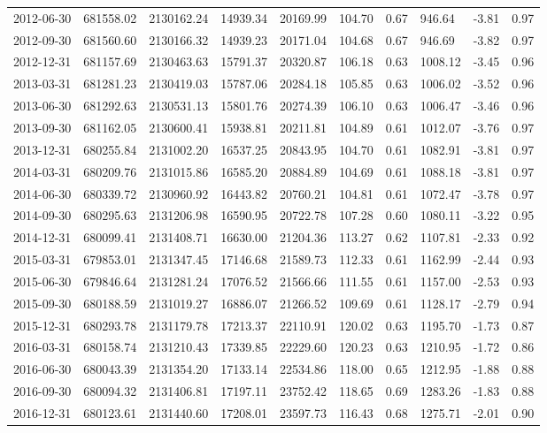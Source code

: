 \begin{landscape}
\begin{longtable}{llllllllll}
2012-06-30 & 681558.02 & 2130162.24 & 14939.34 & 20169.99 & 104.70 & 0.67 & 946.64  & -3.81  & 0.97 \\
2012-09-30 & 681560.60 & 2130166.32 & 14939.23 & 20171.04 & 104.68 & 0.67 & 946.69  & -3.82  & 0.97 \\
2012-12-31 & 681157.69 & 2130463.63 & 15791.37 & 20320.87 & 106.18 & 0.63 & 1008.12 & -3.45  & 0.96 \\
2013-03-31 & 681281.23 & 2130419.03 & 15787.06 & 20284.18 & 105.85 & 0.63 & 1006.02 & -3.52  & 0.96 \\
2013-06-30 & 681292.63 & 2130531.13 & 15801.76 & 20274.39 & 106.10 & 0.63 & 1006.47 & -3.46  & 0.96 \\
2013-09-30 & 681162.05 & 2130600.41 & 15938.81 & 20211.81 & 104.89 & 0.61 & 1012.07 & -3.76  & 0.97 \\
2013-12-31 & 680255.84 & 2131002.20 & 16537.25 & 20843.95 & 104.70 & 0.61 & 1082.91 & -3.81  & 0.97 \\
2014-03-31 & 680209.76 & 2131015.86 & 16585.20 & 20884.89 & 104.69 & 0.61 & 1088.18 & -3.81  & 0.97 \\
2014-06-30 & 680339.72 & 2130960.92 & 16443.82 & 20760.21 & 104.81 & 0.61 & 1072.47 & -3.78  & 0.97 \\
2014-09-30 & 680295.63 & 2131206.98 & 16590.95 & 20722.78 & 107.28 & 0.60 & 1080.11 & -3.22  & 0.95 \\
2014-12-31 & 680099.41 & 2131408.71 & 16630.00 & 21204.36 & 113.27 & 0.62 & 1107.81 & -2.33  & 0.92 \\
2015-03-31 & 679853.01 & 2131347.45 & 17146.68 & 21589.73 & 112.33 & 0.61 & 1162.99 & -2.44  & 0.93 \\
2015-06-30 & 679846.64 & 2131281.24 & 17076.52 & 21566.66 & 111.55 & 0.61 & 1157.00 & -2.53  & 0.93 \\
2015-09-30 & 680188.59 & 2131019.27 & 16886.07 & 21266.52 & 109.69 & 0.61 & 1128.17 & -2.79  & 0.94 \\
2015-12-31 & 680293.78 & 2131179.78 & 17213.37 & 22110.91 & 120.02 & 0.63 & 1195.70 & -1.73  & 0.87 \\
2016-03-31 & 680158.74 & 2131210.43 & 17339.85 & 22229.60 & 120.23 & 0.63 & 1210.95 & -1.72  & 0.86 \\
2016-06-30 & 680043.39 & 2131354.20 & 17133.14 & 22534.86 & 118.00 & 0.65 & 1212.95 & -1.88  & 0.88 \\
2016-09-30 & 680094.32 & 2131406.81 & 17197.11 & 23752.42 & 118.65 & 0.69 & 1283.26 & -1.83  & 0.88 \\
2016-12-31 & 680123.61 & 2131440.60 & 17208.01 & 23597.73 & 116.43 & 0.68 & 1275.71 & -2.01  & 0.90 \\

\end{longtable}
\end{landscape}
